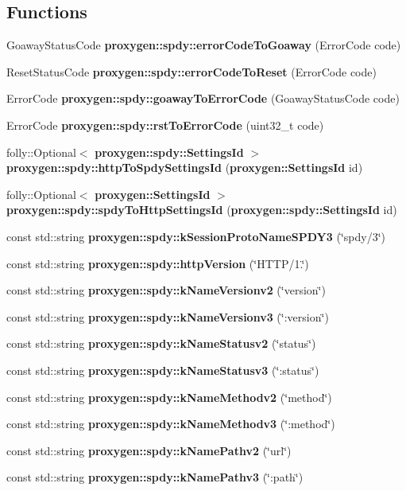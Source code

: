 \subsection*{Functions}
\begin{DoxyCompactItemize}
\item 
Goaway\+Status\+Code {\bf proxygen\+::spdy\+::error\+Code\+To\+Goaway} (Error\+Code code)
\item 
Reset\+Status\+Code {\bf proxygen\+::spdy\+::error\+Code\+To\+Reset} (Error\+Code code)
\item 
Error\+Code {\bf proxygen\+::spdy\+::goaway\+To\+Error\+Code} (Goaway\+Status\+Code code)
\item 
Error\+Code {\bf proxygen\+::spdy\+::rst\+To\+Error\+Code} (uint32\+\_\+t code)
\item 
folly\+::\+Optional$<$ {\bf proxygen\+::spdy\+::\+Settings\+Id} $>$ {\bf proxygen\+::spdy\+::http\+To\+Spdy\+Settings\+Id} ({\bf proxygen\+::\+Settings\+Id} id)
\item 
folly\+::\+Optional$<$ {\bf proxygen\+::\+Settings\+Id} $>$ {\bf proxygen\+::spdy\+::spdy\+To\+Http\+Settings\+Id} ({\bf proxygen\+::spdy\+::\+Settings\+Id} id)
\item 
const std\+::string {\bf proxygen\+::spdy\+::k\+Session\+Proto\+Name\+S\+P\+D\+Y3} (\char`\"{}spdy/3\char`\"{})
\item 
const std\+::string {\bf proxygen\+::spdy\+::http\+Version} (\char`\"{}H\+T\+TP/1.\char`\"{})
\item 
const std\+::string {\bf proxygen\+::spdy\+::k\+Name\+Versionv2} (\char`\"{}version\char`\"{})
\item 
const std\+::string {\bf proxygen\+::spdy\+::k\+Name\+Versionv3} (\char`\"{}\+:version\char`\"{})
\item 
const std\+::string {\bf proxygen\+::spdy\+::k\+Name\+Statusv2} (\char`\"{}status\char`\"{})
\item 
const std\+::string {\bf proxygen\+::spdy\+::k\+Name\+Statusv3} (\char`\"{}\+:status\char`\"{})
\item 
const std\+::string {\bf proxygen\+::spdy\+::k\+Name\+Methodv2} (\char`\"{}method\char`\"{})
\item 
const std\+::string {\bf proxygen\+::spdy\+::k\+Name\+Methodv3} (\char`\"{}\+:method\char`\"{})
\item 
const std\+::string {\bf proxygen\+::spdy\+::k\+Name\+Pathv2} (\char`\"{}url\char`\"{})
\item 
const std\+::string {\bf proxygen\+::spdy\+::k\+Name\+Pathv3} (\char`\"{}\+:path\char`\"{})

\end{DoxyCompactItemize}
